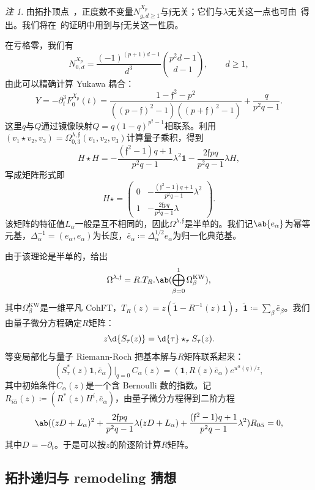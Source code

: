 \documentclass{amsart}
\theoremstyle{definition}
\theoremstyle{remark}
\newtheorem{rmk}[thm]{注}
\theoremstyle{plain}
\theoremstyle{definition}
\theoremstyle{remark}
\newcommand{\mf}[1]{\mathfrak{#1}}
\newcommand{\mr}[1]{\mathrm{#1}}
\newcommand{\wt}[1]{\widetilde{#1}}
\newcommand{\1}{\mathbf{1}}
\newcommand{\2}{\mathbf{2}}
\newcommand{\3}{\mathbf{3}}
\begin{document}
\begin{rmk}
    由拓扑顶点~\cite{LLLZ2009}，正度数不变量\(N^{X_p}_{g,d\geq1}\)与\(\mf{f}\)无关；它们与\(\lambda\)无关这一点也可由~得出。我们将在~的证明中用到与\(\mf{f}\)无关这一性质。
\end{rmk}

在亏格零，我们有
\[ N^{X_p}_{0,d} = \frac{(-1)^{(p+1)d-1}}{d^3}\binom{p^2d-1}{d-1}, \qquad d \geq 1, \]
由此可以精确计算 Yukawa 耦合：
\[ Y = -\partial_t^3 F_0^{X_p}(t) = \frac{1-\mf{f}^2-p^2}{((p-\mf{f})^2-1)((p+\mf{f})^2-1)} + \frac{q}{p^2q-1}. \]
这里\(q\)与\(Q\)通过镜像映射\(Q = q(1-q)^{p^2-1}\)相联系。利用\((v_1 \star v_2, v_3) = \Omega^{\lambda,\mf{f}}_{0,3}(v_1,v_2,v_3)\)计算量子乘积，得到
\[ H \star H = -\frac{(\mf{f}^2-1)q+1}{p^2q-1}\lambda^2 \1 - \frac{2\mf{f}pq}{p^2q-1}\lambda H, \]
写成矩阵形式即
\[ H \star = \begin{pmatrix} 0 & -\frac{(\mf{f}^2-1)q+1}{p^2q-1}\lambda^2 \\ 1 & -\frac{2\mf{f}pq}{p^2q-1}\lambda \end{pmatrix}. \]
该矩阵的特征值\(L_{\alpha}\)一般是互不相同的，因此\(\Omega^{\lambda,\mf{f}}\)是半单的。我们记\(\ab\{e_{\alpha}\}\)为幂等元基，\(\Delta_{\alpha}^{-1} = (e_{\alpha},e_{\alpha})\)为长度，\(\bar{e}_{\alpha} \coloneqq \Delta_{\alpha}^{1/2}e_{\alpha}\)为归一化典范基。

由于该理论是半单的，给出
\[ \Omega^{\lambda,\mf{f}} = R.T_R.\ab(\bigoplus_{\beta=0}^1 \Omega^{\mr{KW}}_{\beta}), \]
其中\(\Omega^{\mr{KW}}_{\beta}\)是一维平凡 CohFT，\(T_R(z) = z(\wt{\1}-R^{-1}(z)\1)\)，\(\wt{\1} \coloneqq \sum_{\beta}\bar{e}_{\beta}\)。我们由量子微分方程确定\(R\)矩阵：
\[ z \d{S_{\tau}(z)} = \d{\tau} \star_{\tau} S_{\tau}(z). \]
等变局部化与量子 Riemann-Roch 把基本解与\(R\)矩阵联系起来：
\[ (S^*_{\tau}(z)\1, \bar{e}_{\alpha})\big|_{q=0}\, C_{\alpha}(z) = (\1, R(z)\bar{e}_{\alpha})e^{u^{\alpha}(q)/z}, \]
其中初始条件\(C_{\alpha}(z)\)是一个含 Bernoulli 数的指数。记\(R_{i\bar{\alpha}}(z) \coloneqq (R^*(z)H^i, \bar{e}_{\alpha})\)，由量子微分方程得到二阶方程
\[ \ab( (zD+L_{\alpha})^2 + \frac{2\mf{f}pq}{p^2q-1}\lambda(zD+L_{\alpha}) + \frac{(\mf{f}^2-1)q+1}{p^2q-1}\lambda^2 )R_{0\bar{\alpha}} = 0, \]
其中\(D = -\partial_t\)。于是可以按\(z\)的阶逐阶计算\(R\)矩阵。

\subsection{拓扑递归与 remodeling 猜想}%
\label{sub:Topological recursion and the remodeling conjecture}
\end{document}
